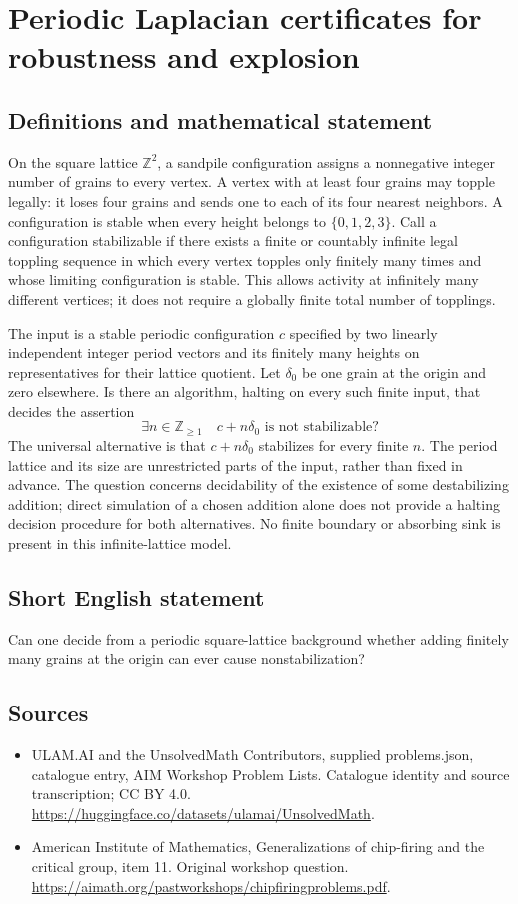 \documentclass[11pt,a4paper]{article}
\begin{document}
\section*{Periodic Laplacian certificates for robustness and explosion}\label{statement}

\subsection{Definitions and mathematical statement}
On the square lattice $\mathbb Z^2$, a sandpile configuration assigns a nonnegative integer number of grains to every vertex.
A vertex with at least four grains may topple legally: it loses four grains and sends one to each of its four nearest neighbors.
A configuration is stable when every height belongs to $\{0,1,2,3\}$.
Call a configuration stabilizable if there exists a finite or countably infinite legal toppling sequence in which every vertex topples only finitely many times and whose limiting configuration is stable.
This allows activity at infinitely many different vertices; it does not require a globally finite total number of topplings.

The input is a stable periodic configuration $c$ specified by two linearly independent integer period vectors and its finitely many heights on representatives for their lattice quotient.
Let $\delta_0$ be one grain at the origin and zero elsewhere.
Is there an algorithm, halting on every such finite input, that decides the assertion
\[
 \exists n\in\mathbb Z_{\geq1}\quad
           c+n\delta_0\text{ is not stabilizable}?
\]
The universal alternative is that $c+n\delta_0$ stabilizes for every finite $n$.
The period lattice and its size are unrestricted parts of the input, rather than fixed in advance.
The question concerns decidability of the existence of some destabilizing addition; direct simulation of a chosen addition alone does not provide a halting decision procedure for both alternatives.
No finite boundary or absorbing sink is present in this infinite-lattice model.
\subsection{Short English statement}
Can one decide from a periodic square-lattice background whether adding finitely many grains at the origin can ever cause nonstabilization?
\subsection{Sources}
\begin{itemize}
\item[S1] ULAM.AI and the UnsolvedMath Contributors, supplied problems.json, catalogue entry, AIM Workshop Problem Lists. Catalogue identity and source transcription; CC BY 4.0.
\url{https://huggingface.co/datasets/ulamai/UnsolvedMath}.
\item[S2] American Institute of Mathematics, Generalizations of chip-firing and the critical group, item 11. Original workshop question.
\url{https://aimath.org/pastworkshops/chipfiringproblems.pdf}.
\end{itemize}
\end{document}
